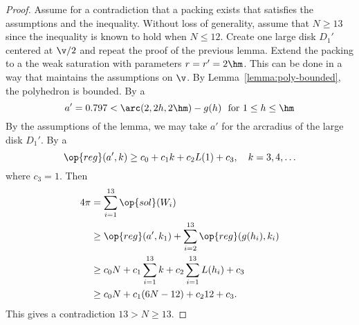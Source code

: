 \begin{proof} Assume for a contradiction that a packing exists that
satisfies the assumptions and the inequality.  Without loss of
generality, assume that $N\ge 13$ since the inequality is known to
hold when $N\le 12$.  Create one large disk $D_1'$ centered at $
\v/2$ and repeat the proof of the previous lemma.  Extend the packing to a the weak
saturation with parameters $r=r'=2\hm$.  This can be done in a way that maintains
the assumptions on $\v$.  By
Lemma~\ref{lemma:poly-bounded}, the polyhedron is
bounded.  By a 
\[ a'=0.797 < \arc(2,2h,2\hm)-g(h)\text{\ \ for } 1\le h \le \hm\]  
By the assumptions of the lemma, we may take $a'$
for the arcradius of the large disk $D_1'$.  
By a 
\begin{equation}\label{eqn:alin2} 
\op{reg}(a',k) \ge c_0 + c_1 k + c_2 L(1) +
c_3,\quad k=3,4,\ldots\end{equation}
where
$c_3 =  1$.  %
Then 
\begin{align*} \label{eqn:D'}
4\pi &= \sum_{i=1}^{13}\op{sol}(W_i)\\
&\ge \op{reg}(a',k_1)+\sum_{i=2}^{13} \op{reg}(g(h_i),k_i) \\
&\ge  c_0 N +c_1\sum_{i=1}^{13} k + c_2 \sum_{i=1}^{13} L(h_i) + c_3\\
&\ge c_0 N +c_1 (6N-12) + c_2 12 + c_3.
\end{align*}
This gives a contradiction
$13 > N \ge 13.$
\end{proof}
